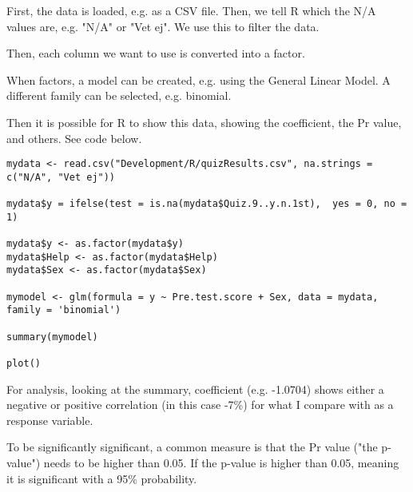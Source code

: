 First, the data is loaded, e.g. as a CSV file. Then, we tell R which the N/A values are, e.g. "N/A" or "Vet ej". We use this to filter the data.

Then, each column we want to use is converted into a factor.

When factors, a model can be created, e.g. using the General Linear Model. A different family can be selected, e.g. binomial.

Then it is possible for R to show this data, showing the coefficient, the Pr value, and others. See code below.

\begin{verbatim}
mydata <- read.csv("Development/R/quizResults.csv", na.strings = c("N/A", "Vet ej"))

mydata$y = ifelse(test = is.na(mydata$Quiz.9..y.n.1st),  yes = 0, no = 1)

mydata$y <- as.factor(mydata$y)
mydata$Help <- as.factor(mydata$Help)
mydata$Sex <- as.factor(mydata$Sex)

mymodel <- glm(formula = y ~ Pre.test.score + Sex, data = mydata, family = 'binomial')

summary(mymodel)

plot()
\end{verbatim}

For analysis, looking at the summary, coefficient (e.g. -1.0704) shows either a negative or positive correlation (in this case -7\%) for what I compare with as a response variable.

To be significantly significant, a common measure is that the Pr value ("the p-value") needs to be higher than 0.05. If the p-value is higher than 0.05, meaning it is significant with a 95\% probability.
